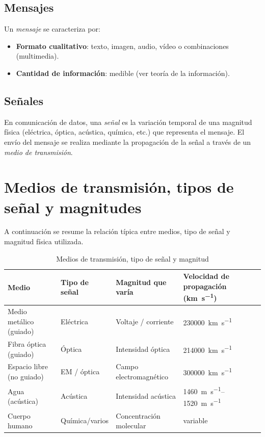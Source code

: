 \documentclass[11pt,a4paper]{article}
\begin{document}
\subsection{Mensajes}
Un \emph{mensaje} se caracteriza por:
\begin{itemize}
  \item \textbf{Formato cualitativo}: texto, imagen, audio, vídeo o combinaciones (multimedia).
  \item \textbf{Cantidad de información}: medible (ver teoría de la información).
\end{itemize}

\subsection{Señales}
En comunicación de datos, una \emph{señal} es la variación temporal de una magnitud física (eléctrica, óptica, acústica, química, etc.) que representa el mensaje. El envío del mensaje se realiza mediante la propagación de la señal a través de un \emph{medio de transmisión}.

\section{Medios de transmisión, tipos de señal y magnitudes}
A continuación se resume la relación típica entre medios, tipo de señal y magnitud física utilizada.

\begin{table}[H]
  \centering
  \caption{Medios de transmisión, tipo de señal y magnitud}
  \begin{tabular}{l l l l}
    \toprule
    Medio & Tipo de señal & Magnitud que varía & Velocidad de propagación (\si{\kilo\meter\per\second}) \\
    \midrule
    Medio metálico (guiado) & Eléctrica & Voltaje / corriente & \SI{230000}{\kilo\meter\per\second} \\
    Fibra óptica (guiado) & Óptica & Intensidad óptica & \SI{214000}{\kilo\meter\per\second} \\
    Espacio libre (no guiado) & EM / óptica & Campo electromagnético & \SI{300000}{\kilo\meter\per\second} \\
    Agua (acústica) & Acústica & Intensidad acústica & \SIrange{1460}{1520}{\meter\per\second} \\
    Cuerpo humano & Química/varios & Concentración molecular & variable \\
    \bottomrule
  \end{tabular}
\end{table}
\end{document}
